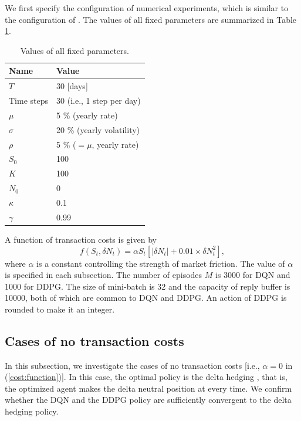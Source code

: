 \documentclass[11pt]{article}
\begin{document}
We first specify the configuration of numerical experiments, which is similar to the configuration of \citep{Kolm:Ritter:2019}. The values of all fixed parameters are summarized in Table \ref{Table1}.
%
\begin{table}[htb]
\begin{center}
  \begin{tabular}{| l || l | } \hline
    Name & Value \\ \hline
    $T$ & 30 [days] \\ \hline
    Time steps & 30 (i.e., 1 step per day) \\ \hline
    $\mu$ & 5 \% (yearly rate) \\ \hline
    $\sigma$ & 20 \% (yearly volatility) \\ \hline
    $\rho$ & 5 \% ($= \mu$, yearly rate) \\ \hline
    $S_0$ & 100 \\ \hline
    $K$ & 100 \\ \hline
    $N_0$ & 0 \\ \hline
    $\kappa$ & 0.1 \\ \hline
    $\gamma$ & 0.99 \\ \hline 
  \end{tabular}
  \caption{Values of all fixed parameters.}
  \label{Table1}
 \end{center}
\end{table}
%
A function of transaction costs is given by
%
\begin{equation}
	f(S_t, \delta N_t) = \alpha S_t \left[ |\delta N_t| + 0.01 \times \delta N_t^2 \right], \label{cost:function}
\end{equation}
%
where $\alpha$ is a constant controlling the strength of market friction. The value of $\alpha$ is specified in each subsection. The number of episodes $M$ is 3000 for DQN and 1000 for DDPG. The size of mini-batch is 32 and the capacity of reply buffer is 10000, both of which are common to DQN and DDPG. An action of DDPG is rounded to make it an integer.

\subsection{Cases of no transaction costs}

In this subsection, we investigate the cases of no transaction costs [i.e., $\alpha = 0$ in (\ref{cost:function})]. In this case, the optimal policy is the delta hedging \citep{Kolm:Ritter:2019}, that is, the optimized agent makes the delta neutral position at every time. We confirm whether the DQN and the DDPG policy are sufficiently convergent to the delta hedging policy.
\end{document}
